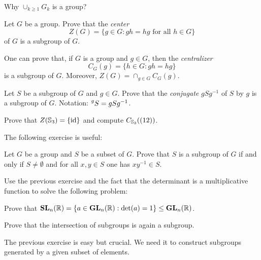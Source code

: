 Why $\cup_{k\geq1}G_k$ is a group? 

\begin{exercise}
\label{xca:center}
        Let $G$ be a group. Prove that the \emph{center} 
        \[
                Z(G)=\{g\in G:gh=hg\text{ for all $h\in G$}\}
        \]
        of $G$ is a subgroup of $G$. 
\end{exercise}

One can prove that, if $G$ is a group and $g\in G$, then 
the \emph{centralizer} 
\[
C_G(g)=\{h\in G:gh=hg\}
\]
is a subgroup of $G$. Moreover, 
$Z(G)=\cap_{g\in G}C_G(g)$. 

\begin{exercise}
        \label{xca:conjugate}
        Let $S$ be a subgroup of $G$ and $g\in G$. Prove that
        the \emph{conjugate} $gSg^{-1}$
        of $S$ by $g$ is a subgroup of $G$. 
        Notation: $\prescript{g}{}S=gSg^{-1}$.
\end{exercise}


\begin{exercise}
\label{xca:center_S3}
        Prove that $Z(\mathbb{S}_3)=\{\operatorname{id}\}$ and compute $C_{\mathbb{S}_3}((12))$.
\end{exercise}

The following exercise is useful: 

\begin{exercise}
\label{xca:subgroup}
        Let $G$ be a group and $S$ be a subset of $G$. 
        Prove that $S$ is a subgroup of $G$ if and only if 
        $S\ne\emptyset$ and for all $x,y\in S$ one has
        $xy^{-1}\in S$.
\end{exercise}

Use the previous exercise and
the fact that the determinant is a multiplicative function
to solve the following problem:

\begin{exercise}
\label{xca:SL_subgroup}
Prove that $\mathbf{SL}_n(\mathbb{R})=\{a\in\mathbf{GL}_n(\mathbb{R}):\det(a)=1\}\leq\mathbf{GL}_n(\mathbb{R})$. 
\end{exercise}

\begin{exercise}
\label{xca:intersection}
    Prove that the intersection of subgroups is again a subgroup.
\end{exercise}

The previous exercise is easy but crucial. We need it 
to construct subgroups generated 
by a given subset of elements. 

